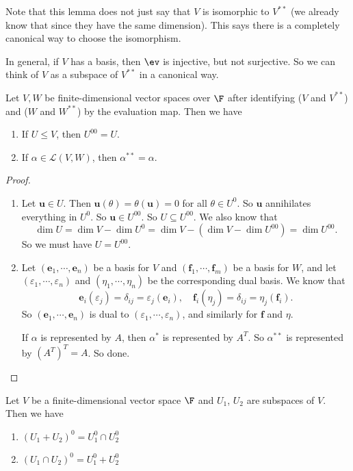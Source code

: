 \documentclass[a4paper]{article}
\begin{document}
Note that this lemma does not just say that $V$ is isomorphic to $V^{**}$ (we already know that since they have the same dimension). This says there is a completely canonical way to choose the isomorphism.

In general, if $V$ has a basis, then $\ev$ is injective, but not surjective. So we can think of $V$ as a subspace of $V^{**}$ in a canonical way.

\begin{lemma}
  Let $V, W$ be finite-dimensional vector spaces over $\F$ after identifying ($V$ and $V^{**}$) and ($W$ and $W^{**}$) by the evaluation map. Then we have
  \begin{enumerate}
    \item If $U\leq V$, then $U^{00} = U$.
    \item If $\alpha\in \mathcal{L}(V, W)$, then $\alpha^{**} = \alpha$.
  \end{enumerate}
\end{lemma}

\begin{proof}\leavevmode
  \begin{enumerate}
    \item Let $\mathbf{u} \in U$. Then $\mathbf{u}(\theta) = \theta(\mathbf{u}) = 0$ for all $\theta \in U^0$. So $\mathbf{u}$ annihilates everything in $U^0$. So $\mathbf{u} \in U^{00}$. So $U \subseteq U^{00}$. We also know that
      \[
        \dim U = \dim V - \dim U^0 = \dim V - (\dim V - \dim U^{00}) = \dim U^{00}.
      \]
      So we must have $U = U^{00}$.
    \item Let $(\mathbf{e}_1, \cdots, \mathbf{e}_n)$ be a basis for $V$ and $(\mathbf{f}_1, \cdots, \mathbf{f}_m)$ be a basis for $W$, and let $(\varepsilon_1, \cdots, \varepsilon_n)$ and $(\eta_1, \cdots, \eta_n)$ be the corresponding dual basis. We know that
      \[
        \mathbf{e}_i(\varepsilon_j) = \delta_{ij} = \varepsilon_j(\mathbf{e}_i),\quad \mathbf{f}_i(\eta_j) = \delta_{ij} = \eta_j(\mathbf{f}_i).
      \]
      So $(\mathbf{e}_1, \cdots, \mathbf{e}_n)$ is dual to $(\varepsilon_1, \cdots, \varepsilon_n)$, and similarly for $\mathbf{f}$ and $\eta$.

      If $\alpha$ is represented by $A$, then $\alpha^*$ is represented by $A^T$. So $\alpha^{**}$ is represented by $(A^T)^T = A$. So done.
  \end{enumerate}
\end{proof}

\begin{prop}
  Let $V$ be a finite-dimensional vector space $\F$ and $U_1$, $U_2$ are subspaces of $V$. Then we have
  \begin{enumerate}
    \item $(U_1 + U_2)^0 = U_1^0 \cap U_2^0$
    \item $(U_1 \cap U_2)^0 = U_1^0 + U_2^0$
  \end{enumerate}
\end{prop}
\end{document}
